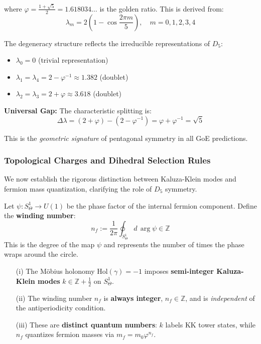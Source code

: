 \documentclass[12pt]{article}
\begin{document}
where $\varphi = \frac{1+\sqrt{5}}{2} = 1.618034\ldots$ is the golden ratio. This is derived from:
\begin{equation}
\lambda_m = 2\left(1 - \cos\frac{2\pi m}{5}\right), \quad m = 0,1,2,3,4
\end{equation}

The degeneracy structure reflects the irreducible representations of $D_5$:
\begin{itemize}
\item $\lambda_0 = 0$ (trivial representation)
\item $\lambda_1 = \lambda_4 = 2 - \varphi^{-1} \approx 1.382$ (doublet)
\item $\lambda_2 = \lambda_3 = 2 + \varphi \approx 3.618$ (doublet)
\end{itemize}

\textbf{Universal Gap:} The characteristic splitting is:
\begin{equation}
\Delta\lambda = (2 + \varphi) - (2 - \varphi^{-1}) = \varphi + \varphi^{-1} = \sqrt{5}
\end{equation}

This is the \textit{geometric signature} of pentagonal symmetry in all GoE predictions.

\subsubsection{Topological Charges and Dihedral Selection Rules}
\label{sec:topological_charges}

We now establish the rigorous distinction between Kaluza-Klein modes and fermion mass quantization, clarifying the role of $D_5$ symmetry.

\begin{definition}
Let $\psi: S^1_\Theta \to U(1)$ be the phase factor of the internal fermion component. Define the \textbf{winding number}:
\begin{equation}
n_f := \frac{1}{2\pi} \oint_{S^1_\Theta} d\,\arg\psi \in \mathbb{Z}
\end{equation}
This is the degree of the map $\psi$ and represents the number of times the phase wraps around the circle.
\end{definition}

\begin{proposition}
\label{prop:kn_separation}
\begin{enumerate}
\item[(i)] The M\"obius holonomy $\text{Hol}(\gamma) = -1$ imposes \textbf{semi-integer Kaluza-Klein modes} $k \in \mathbb{Z} + \tfrac{1}{2}$ on $S^1_\Theta$.
\item[(ii)] The winding number $n_f$ is \textbf{always integer}, $n_f \in \mathbb{Z}$, and is \emph{independent} of the antiperiodicity condition.
\item[(iii)] These are \textbf{distinct quantum numbers}: $k$ labels KK tower states, while $n_f$ quantizes fermion masses via $m_f = m_0 \varphi^{n_f}$.
\end{enumerate}
\end{proposition}
\end{document}
